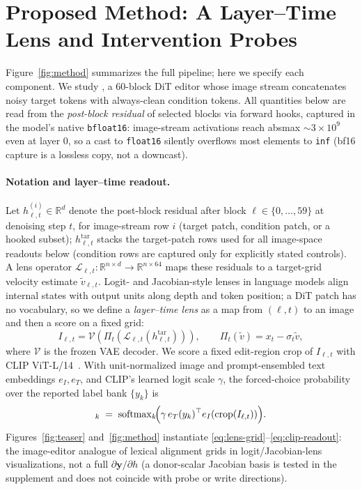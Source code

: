 \section{Proposed Method: A Layer--Time Lens and Intervention Probes}\label{sec:method}

Figure~\ref{fig:method} summarizes the full pipeline; here we specify each
component. We study \model{}, a 60-block DiT editor whose image stream
concatenates noisy target tokens with always-clean condition tokens. All
quantities below are read from the
\emph{post-block residual} of selected blocks via forward hooks,
captured in the model's native \texttt{bfloat16}: image-stream
activations reach absmax ${\sim}3{\times}10^{9}$ even at layer 0, so a cast
to \texttt{float16} silently overflows most elements to \texttt{inf}
(bf16 capture is a lossless copy, not a downcast).

\paragraph{Notation and layer--time readout.}
Let $h_{\ell,t}^{(i)}\!\in\!\mathbb{R}^{d}$ denote the post-block residual
after block $\ell\!\in\!\{0,\ldots,59\}$ at denoising step $t$, for
image-stream row $i$ (target patch, condition patch, or a hooked subset);
$h^{\mathrm{tar}}_{\ell,t}$ stacks the target-patch rows used for all
image-space readouts below (condition rows are captured only for explicitly
stated controls). A lens operator
$\mathcal{L}_{\ell,t}:\mathbb{R}^{n\times d}\!\to\!\mathbb{R}^{n\times64}$
maps these residuals to a target-grid velocity estimate $\tilde v_{\ell,t}$.
Logit- and Jacobian-style lenses in language models align internal states
with output units along depth and token position; a DiT patch has no
vocabulary, so we define a \emph{layer--time lens} as a map from
$(\ell,t)$ to an image and then a score on a fixed grid:
\begin{equation}
  I_{\ell,t}
  = \mathcal{V}\!\left(\Pi_t\!\left(
  \mathcal{L}_{\ell,t}(h^{\mathrm{tar}}_{\ell,t})\right)\right),
  \qquad
  \Pi_t(\tilde v)=x_t-\sigma_t\tilde v,
  \label{eq:lens-grid}
\end{equation}
where $\mathcal{V}$ is the frozen VAE decoder. We score a fixed edit-region
crop of $I_{\ell,t}$ with CLIP ViT-L/14~\citep{radford2021clip}. With
unit-normalized image and prompt-ensembled text embeddings $e_I,e_T$, and
CLIP's learned logit scale $\gamma$, the forced-choice probability over the
reported label bank $\{y_k\}$ is
\begin{equation}
  [\mathcal{M}_{\ell,t}]_k
  \;=\;
  \mathrm{softmax}_k\!\Bigl(
    \gamma\, e_T(y_k)^\top e_I(\mathrm{crop}(I_{\ell,t}))
  \Bigr).
  \label{eq:clip-readout}
\end{equation}
Figures~\ref{fig:teaser} and~\ref{fig:method} instantiate
\eqref{eq:lens-grid}--\eqref{eq:clip-readout}: the image-editor analogue of
lexical alignment grids in logit/Jacobian-lens visualizations, not a full
$\partial \mathbf{y}/\partial h$ (a donor-scalar Jacobian basis is tested in
the supplement and does not coincide with probe or write directions).

